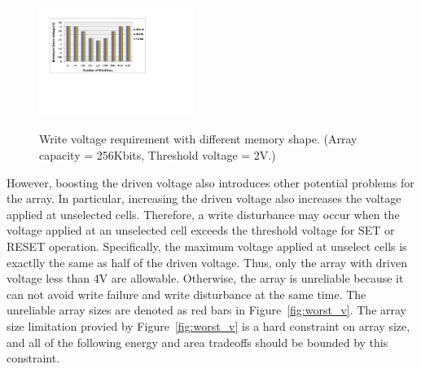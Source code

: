 \begin{figure}%
\centering
  \includegraphics[width=0.45\textwidth]{./figures/shape_f.pdf}\\
  \caption{Write voltage requirement with different memory shape. (Array capacity = 256Kbits, Threshold voltage = 2V.)}\label{fig:shape}
    \vspace{-15pt}
\end{figure}

However, boosting the driven voltage also introduces other potential
problems for the array. In particular, increasing the driven voltage also
increases the voltage applied at unselected cells. Therefore, a write
disturbance may occur when the voltage applied at an unselected cell
exceeds the threshold voltage for SET or RESET operation. Specifically,
the maximum voltage applied at unselect cells is exactlly the same as half
of the driven voltage. Thus, only the array with driven voltage less than
4V are allowable.  Otherwise, the array is unreliable because it can not
avoid write failure and write disturbance at the same time. The unreliable
array sizes are denoted as red bars in Figure~\ref{fig:worst_v}. The array
size limitation provied by Figure~\ref{fig:worst_v} is a hard constraint
on array size, and all of the following energy and area tradeoffs should
be bounded by this constraint.





